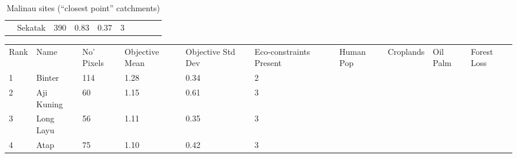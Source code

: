 \begin{table}[ht]
\begin{tabular}{C{0.05\textwidth}C{0.15\textwidth}C{0.08\textwidth}C{0.08\textwidth}C{0.08\textwidth}C{0.08\textwidth}C{0.08\textwidth}C{0.08\textwidth}C{0.08\textwidth}C{0.08\textwidth}}
   & Sekatak & 390 & \textcolor[HTML]{000000}{0.83} & \textcolor[HTML]{FFFFFF}{0.37} & \textcolor[HTML]{FFFFFF}{3} &  &  &  &  \\ 
  \end{tabular}
\endgroup
\caption{Malinau sites (``closest point'' catchments)} 
\end{table}
\begin{table}[ht]
\centering
\begingroup\fontsize{9pt}{10pt}\selectfont
\begin{tabular}{C{0.05\textwidth}C{0.15\textwidth}C{0.08\textwidth}C{0.08\textwidth}C{0.08\textwidth}C{0.08\textwidth}C{0.08\textwidth}C{0.08\textwidth}C{0.08\textwidth}C{0.08\textwidth}}
 Rank & Name & No' Pixels & Objective Mean & Objective Std Dev & Eco-constraints  Present & Human Pop & Croplands & Oil Palm & Forest Loss \\ 
 {1} & Binter & 114 & \textcolor[HTML]{FFFFFF}{1.28} & \textcolor[HTML]{000000}{0.34} & \textcolor[HTML]{000000}{2} &  &  &  &  \\ 
  {2} & Aji Kuning &  60 & \textcolor[HTML]{FFFFFF}{1.15} & \textcolor[HTML]{FFFFFF}{0.61} & \textcolor[HTML]{FFFFFF}{3} &  &  &  &  \\ 
  {3} & Long Layu &  56 & \textcolor[HTML]{FFFFFF}{1.11} & \textcolor[HTML]{000000}{0.35} & \textcolor[HTML]{FFFFFF}{3} &  &  &  &  \\ 
  {4} & Atap &  75 & \textcolor[HTML]{FFFFFF}{1.10} & \textcolor[HTML]{FFFFFF}{0.42} & \textcolor[HTML]{FFFFFF}{3} &  &  &  &  \\ 

\end{tabular}
\end{table}
